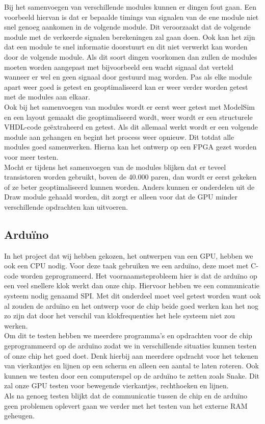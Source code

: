 \documentclass{scrartcl} %
\begin{document}
Bij het samenvoegen van verschillende modules kunnen er dingen fout gaan. Een voorbeeld hiervan is dat er bepaalde timings van signalen van de ene module niet snel genoeg aankomen in de volgende module.
Dit veroorzaakt dat de volgende module met de verkeerde signalen berekeningen zal gaan doen. Ook kan het zijn dat een module te snel informatie doorstuurt en dit niet verwerkt kan worden door de volgende module.
Als dit soort dingen voorkomen dan zullen de modules moeten worden aangepast met bijvoorbeeld een wacht signaal dat verteld wanneer er wel en geen signaal door gestuurd mag worden. Pas als elke module apart weer goed is getest 
en geoptimaliseerd kan er weer verder worden getest met de modules aan elkaar.\\
Ook bij het samenvoegen van modules wordt er eerst weer getest met ModelSim en een layout gemaakt die geoptimaliseerd wordt, weer wordt er een structurele VHDL-code geëxtraheerd en getest. Als dit allemaal werkt wordt er een volgende 
module aan gehangen en begint het process weer opnieuw. Dit totdat alle modules goed samenwerken. Hierna kan het ontwerp op een FPGA gezet worden voor meer testen.\\
Mocht er tijdens het samenvoegen van de modules blijken dat er teveel transistoren worden gebruikt, boven de 40.000 paren, dan wordt er eerst gekeken of ze beter geoptimaliseerd kunnen worden. Anders kunnen er onderdelen uit de Draw module gehaald worden,
 dit zorgt er alleen voor dat de GPU minder verschillende opdrachten kan uitvoeren.


\subsection{Arduïno}

In het project dat wij hebben gekozen, het ontwerpen van een GPU, hebben we ook een CPU nodig. Voor deze taak gebruiken we een arduïno, deze moet met C-code worden geprogrameerd. Het voornaamsteprobleem hier is dat 
de arduïno op een veel snellere klok werkt dan onze chip. Hiervoor hebben we een communicatie systeem nodig genaamd SPI. Met dit onderdeel moet veel getest worden want ook al zouden de arduïno en het ontwerp voor de chip beide goed werken 
kan het nog zo zijn dat door het verschil van klokfrequenties het hele systeem niet zou werken.\\
Om dit te testen hebben we meerdere programma's en opdrachten voor de chip geprogrammeerd op de arduïno zodat we in verschillende situaties kunnen testen of onze chip het goed doet. Denk hierbij aan meerdere opdracht voor het tekenen van vierkantjes
en lijnen op een scherm en alleen een aantal te laten roteren. Ook kunnen we testen door een computerspel op de arduïno te zetten zoals Snake. Dit zal onze GPU testen voor bewegende vierkantjes, rechthoeken en lijnen.\\
Als na genoeg testen blijkt dat de communicatie tussen de chip en de arduïno geen problemen oplevert gaan we verder met het testen van het externe RAM geheugen.
\end{document}
